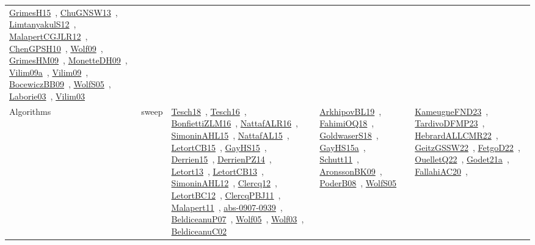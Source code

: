 {\begin{longtable}{lp{3cm}>{\raggedright\arraybackslash}p{6cm}>{\raggedright\arraybackslash}p{6cm}>{\raggedright\arraybackslash}p{8cm}}
\href{works/GrimesH15.pdf}{GrimesH15}~\cite{GrimesH15}, \href{works/ChuGNSW13.pdf}{ChuGNSW13}~\cite{ChuGNSW13}, \href{works/LimtanyakulS12.pdf}{LimtanyakulS12}~\cite{LimtanyakulS12}, \href{works/MalapertCGJLR12.pdf}{MalapertCGJLR12}~\cite{MalapertCGJLR12}, \href{works/ChenGPSH10.pdf}{ChenGPSH10}~\cite{ChenGPSH10}, \href{works/Wolf09.pdf}{Wolf09}~\cite{Wolf09}, \href{works/GrimesHM09.pdf}{GrimesHM09}~\cite{GrimesHM09}, \href{works/MonetteDH09.pdf}{MonetteDH09}~\cite{MonetteDH09}, \href{works/Vilim09a.pdf}{Vilim09a}~\cite{Vilim09a}, \href{works/Vilim09.pdf}{Vilim09}~\cite{Vilim09}, \href{works/BocewiczBB09.pdf}{BocewiczBB09}~\cite{BocewiczBB09}, \href{works/WolfS05.pdf}{WolfS05}~\cite{WolfS05}, \href{works/Laborie03.pdf}{Laborie03}~\cite{Laborie03}, \href{works/Vilim03.pdf}{Vilim03}~\cite{Vilim03}\\
Algorithms & sweep & \href{works/Tesch18.pdf}{Tesch18}~\cite{Tesch18}, \href{works/Tesch16.pdf}{Tesch16}~\cite{Tesch16}, \href{works/BonfiettiZLM16.pdf}{BonfiettiZLM16}~\cite{BonfiettiZLM16}, \href{works/NattafALR16.pdf}{NattafALR16}~\cite{NattafALR16}, \href{works/SimoninAHL15.pdf}{SimoninAHL15}~\cite{SimoninAHL15}, \href{works/NattafAL15.pdf}{NattafAL15}~\cite{NattafAL15}, \href{works/LetortCB15.pdf}{LetortCB15}~\cite{LetortCB15}, \href{works/GayHS15.pdf}{GayHS15}~\cite{GayHS15}, \href{works/Derrien15.pdf}{Derrien15}~\cite{Derrien15}, \href{works/DerrienPZ14.pdf}{DerrienPZ14}~\cite{DerrienPZ14}, \href{works/Letort13.pdf}{Letort13}~\cite{Letort13}, \href{works/LetortCB13.pdf}{LetortCB13}~\cite{LetortCB13}, \href{works/SimoninAHL12.pdf}{SimoninAHL12}~\cite{SimoninAHL12}, \href{works/Clercq12.pdf}{Clercq12}~\cite{Clercq12}, \href{works/LetortBC12.pdf}{LetortBC12}~\cite{LetortBC12}, \href{works/ClercqPBJ11.pdf}{ClercqPBJ11}~\cite{ClercqPBJ11}, \href{works/Malapert11.pdf}{Malapert11}~\cite{Malapert11}, \href{works/abs-0907-0939.pdf}{abs-0907-0939}~\cite{abs-0907-0939}, \href{works/BeldiceanuP07.pdf}{BeldiceanuP07}~\cite{BeldiceanuP07}, \href{works/Wolf05.pdf}{Wolf05}~\cite{Wolf05}, \href{works/Wolf03.pdf}{Wolf03}~\cite{Wolf03}, \href{works/BeldiceanuC02.pdf}{BeldiceanuC02}~\cite{BeldiceanuC02} & \href{works/ArkhipovBL19.pdf}{ArkhipovBL19}~\cite{ArkhipovBL19}, \href{works/FahimiOQ18.pdf}{FahimiOQ18}~\cite{FahimiOQ18}, \href{works/GoldwaserS18.pdf}{GoldwaserS18}~\cite{GoldwaserS18}, \href{works/GayHS15a.pdf}{GayHS15a}~\cite{GayHS15a}, \href{works/Schutt11.pdf}{Schutt11}~\cite{Schutt11}, \href{works/AronssonBK09.pdf}{AronssonBK09}~\cite{AronssonBK09}, \href{works/PoderB08.pdf}{PoderB08}~\cite{PoderB08}, \href{works/WolfS05.pdf}{WolfS05}~\cite{WolfS05} & \href{works/KameugneFND23.pdf}{KameugneFND23}~\cite{KameugneFND23}, \href{works/TardivoDFMP23.pdf}{TardivoDFMP23}~\cite{TardivoDFMP23}, \href{works/HebrardALLCMR22.pdf}{HebrardALLCMR22}~\cite{HebrardALLCMR22}, \href{works/GeitzGSSW22.pdf}{GeitzGSSW22}~\cite{GeitzGSSW22}, \href{works/FetgoD22.pdf}{FetgoD22}~\cite{FetgoD22}, \href{works/OuelletQ22.pdf}{OuelletQ22}~\cite{OuelletQ22}, \href{works/Godet21a.pdf}{Godet21a}~\cite{Godet21a}, \href{works/FallahiAC20.pdf}{FallahiAC20}~\cite{FallahiAC20}, 
\end{longtable}}
